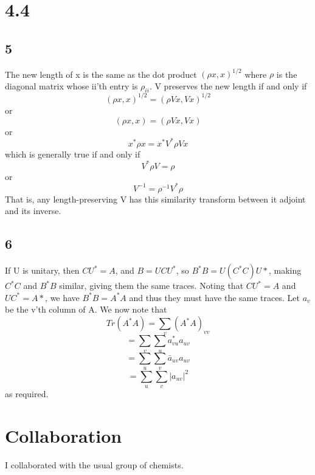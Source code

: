 \documentclass{article}
\begin{document}
\section*{4.4}
\subsection*{5}
The new length of x is the same as the dot product $(\rho x, x)^{1/2}$ where $\rho$ is the diagonal matrix whose ii'th entry is $\rho_{ii}$.  V preserves the new length if and only if
$$(\rho x, x)^{1/2} = (\rho Vx,Vx)^{1/2}$$
or 
$$(\rho x, x) = (\rho V x, V x)$$
or
$$x^*\rho x = x^*V^*\rho Vx$$
which is generally true if and only if 
$$V^*\rho V = \rho$$
or
$$V^{-1} = \rho^{-1}V^*\rho$$
That is, any length-preserving V has this similarity transform between it adjoint and its inverse.

\subsection*{6}
If U is unitary, then $CU^* = A$, and $B=UCU^*$, so $B^*B= U(C^*C)U*$, making $C^*C$ and $B^*B$ similar, giving them the same traces.  Noting that $CU^* = A$ and $UC^* = A*$, we have $B^*B = A^*A$ and thus they must have the same traces.  Let $a_v$ be the v'th column of A.  We now note that 
$$Tr(A^*A) = \sum_{v}(A^*A)_{vv}$$
$$= \sum_{v} \sum_{u}a^*_{vu}a_{uv}$$
$$ = \sum_{u}\sum_{v}\bar{a}_{uv}a_{uv}$$
$$ = \sum_{u}\sum_{v}|a_{uv}|^2$$
as required.

\section*{Collaboration}
I collaborated with the usual group of chemists.
\end{document}
